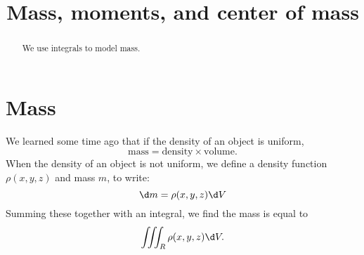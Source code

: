\documentclass{ximera}
\title[Dig-In:]{Mass, moments, and center of mass}
\begin{document}
\begin{abstract}
  We use integrals to model mass.
\end{abstract}
\maketitle

\section{Mass}

We learned some time ago that if the density of an object is uniform,
\[
\text{mass} = \text{density}\times\text{volume}.
\]
When the density of an object is not uniform, we define a density
function $\rho(x,y,z)$ and mass $m$, to write:
\[
\d m = \rho(x,y,z) \d V
\]
Summing these together with an integral, we find the mass
is equal to
\[
\iiint_R \rho(x,y,z) \d V.
\]
\end{document}
